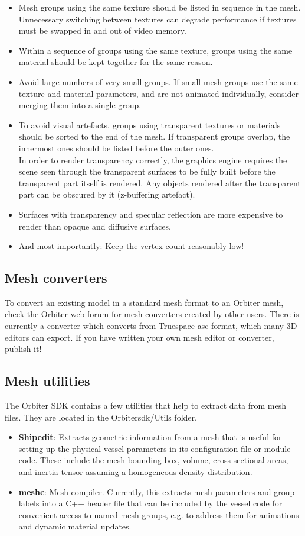 \documentclass[Orbiter Developer Manual.tex]{subfiles}
\begin{document}
\begin{itemize}
\item Mesh groups using the same texture should be listed in sequence in the mesh. Unnecessary switching between textures can degrade performance if textures must be swapped in and out of video memory.
\item Within a sequence of groups using the same texture, groups using the same material should be kept together for the same reason.
\item Avoid large numbers of very small groups. If small mesh groups use the same texture and material parameters, and are not animated individually, consider merging them into a single group.
\item To avoid visual artefacts, groups using transparent textures or materials should be sorted to the end of the mesh. If transparent groups overlap, the innermost ones should be listed before the outer ones.\\
In order to render transparency correctly, the graphics engine requires the scene seen through the transparent surfaces to be fully built before the transparent part itself is rendered. Any objects rendered after the transparent part can be obscured by it (z-buffering artefact).
\item Surfaces with transparency and specular reflection are more expensive to render than opaque and diffusive surfaces.
\item And most importantly: Keep the vertex count reasonably low!
\end{itemize}


\subsection{Mesh converters}
To convert an existing model in a standard mesh format to an Orbiter mesh, check the Orbiter web forum for mesh converters created by other users. There is currently a converter which converts from Truespace asc format, which many 3D editors can export. If you have written your own mesh editor or converter, publish it!


\subsection{Mesh utilities}
The Orbiter SDK contains a few utilities that help to extract data from mesh files. They are located in the Orbitersdk/Utils folder.

\begin{itemize}
\item \textbf{Shipedit}: Extracts geometric information from a mesh that is useful for setting up the physical vessel parameters in its configuration file or module code. These include the mesh bounding box, volume, cross-sectional areas, and inertia tensor assuming a homogeneous density distribution.
\item \textbf{meshc}: Mesh compiler. Currently, this extracts mesh parameters and group labels into a C++ header file that can be included by the vessel code for convenient access to named mesh groups, e.g. to address them for animations and dynamic material updates.
\end{itemize}
\end{document}
